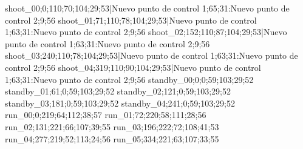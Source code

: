 shoot_00;0;110;70;104;29;53|Nuevo punto de control 1;65;31:Nuevo punto de control 2;9;56
shoot_01;71;110;78;104;29;53|Nuevo punto de control 1;63;31:Nuevo punto de control 2;9;56
shoot_02;152;110;87;104;29;53|Nuevo punto de control 1;63;31:Nuevo punto de control 2;9;56
shoot_03;240;110;78;104;29;53|Nuevo punto de control 1;63;31:Nuevo punto de control 2;9;56
shoot_04;319;110;90;104;29;53|Nuevo punto de control 1;63;31:Nuevo punto de control 2;9;56
standby_00;0;0;59;103;29;52
standby_01;61;0;59;103;29;52
standby_02;121;0;59;103;29;52
standby_03;181;0;59;103;29;52
standby_04;241;0;59;103;29;52
run_00;0;219;64;112;38;57
run_01;72;220;58;111;28;56
run_02;131;221;66;107;39;55
run_03;196;222;72;108;41;53
run_04;277;219;52;113;24;56
run_05;334;221;63;107;33;55
